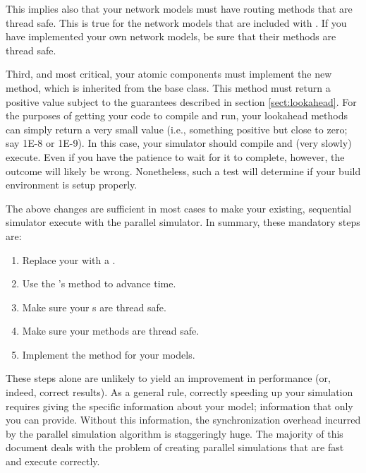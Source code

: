 This implies also that your network models must have routing methods that are thread safe. This is true for the network models that are included with \adevs. If you have implemented your own network models, be sure that their  methods are thread safe.

Third, and most critical, your atomic components must implement the new  method, which is inherited from the  base class. This method must return a positive value subject to the guarantees described in section \ref{sect:lookahead}. For the purposes of getting your code to compile and run, your lookahead methods can simply return a very small value (i.e., something positive but close to zero; say 1E-8 or 1E-9). In this case, your simulator should compile and (very slowly) execute. Even if you have the patience to wait for it to complete, however, the outcome will likely be wrong. Nonetheless, such a test will determine if your build environment is setup properly.

The above changes are sufficient in most cases to make your existing, sequential simulator execute with the parallel simulator. In summary, these mandatory steps are:
\begin{enumerate}
\item Replace your  with a .
\item Use the 's  method to advance time.
\item Make sure your s are thread safe.
\item Make sure your   methods are thread safe.
\item Implement the  method for your  models.
\end{enumerate}

These steps alone are unlikely to yield an improvement in performance (or, indeed, correct results). As a general rule, correctly speeding up your simulation requires giving the  specific information about your model; information that only you can provide. Without this information, the synchronization overhead incurred by the parallel simulation algorithm is staggeringly huge. The majority of this document deals with the problem of creating parallel simulations that are fast and execute correctly.
 
